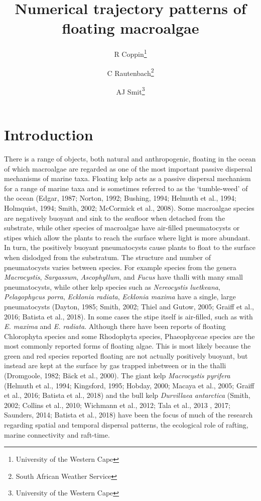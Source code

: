 \documentclass[
]{article}
\title{Numerical trajectory patterns of floating macroalgae}
\author{R Coppin\footnote{University of the Western Cape} \and C Rautenbach\footnote{South African Weather Service} \and AJ Smit\footnote{University of the Western Cape}}
\date{}
\begin{document}
\maketitle

\hypertarget{introduction}{%
\section{Introduction}\label{introduction}}

There is a range of objects, both natural and anthropogenic, floating in
the ocean of which macroalgae are regarded as one of the most important
passive dispersal mechanisms of marine taxa. Floating kelp acts as a
passive dispersal mechanism for a range of marine taxa and is sometimes
referred to as the `tumble-weed' of the ocean (Edgar, 1987; Norton,
1992; Bushing, 1994; Helmuth et al., 1994; Holmquist, 1994; Smith, 2002;
McCormick et al., 2008). Some macroalgae species are negatively buoyant
and sink to the seafloor when detached from the substrate, while other
species of macroalgae have air-filled pneumatocysts or stipes which
allow the plants to reach the surface where light is more abundant. In
turn, the positively buoyant pneumatocysts cause plants to float to the
surface when dislodged from the substratum. The structure and number of
pneumatocysts varies between species. For example species from the
genera \emph{Macrocystis}, \emph{Sargassum}, \emph{Ascophyllum}, and
\emph{Fucus} have thalli with many small pneumatocysts, while other kelp
species such as \emph{Nereocystis luetkeana}, \emph{Pelagophycus porra},
\emph{Ecklonia radiata}, \emph{Ecklonia maxima} have a single, large
pneumatocysts (Dayton, 1985; Smith, 2002; Thiel and Gutow, 2005; Graiff
et al., 2016; Batista et al., 2018). In some cases the stipe itself is
air-filled, such as with \emph{E. maxima} and \emph{E. radiata}.
Although there have been reports of floating Chlorophyta species and
some Rhodophyta species, Phaeophyceae species are the most commonly
reported forms of floating algae. This is most likely because the green
and red species reported floating are not actually positively buoyant,
but instead are kept at the surface by gas trapped inbetween or in the
thalli (Dromgoole, 1982; Bäck et al., 2000). The giant kelp
\emph{Macrocystis pyrifera} (Helmuth et al., 1994; Kingsford, 1995;
Hobday, 2000; Macaya et al., 2005; Graiff et al., 2016; Batista et al.,
2018) and the bull kelp \emph{Durvillaea antarctica} (Smith, 2002;
Collins et al., 2010; Wichmann et al., 2012; Tala et al., 2013 , 2017;
Saunders, 2014; Batista et al., 2018) have been the focus of much of the
research regarding spatial and temporal dispersal patterns, the
ecological role of rafting, marine connectivity and raft-time.
\end{document}

